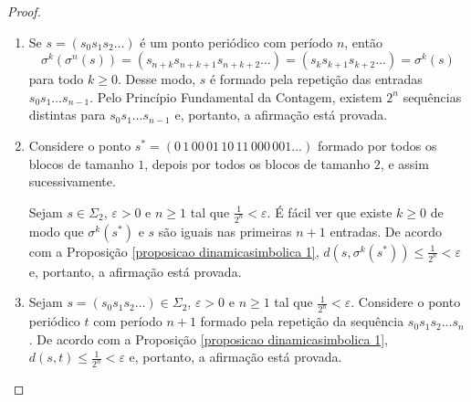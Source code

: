 \begin{proof}
\begin{enumerate}
\item Se $s = (s_0s_1s_2\dots)$ é um ponto periódico com período $n$, então
$$\sigma^k(\sigma^n(s)) = (s_{n+k}s_{n+k+1}s_{n+k+2}\dots) = (s_ks_{k+1}s_{k+2}\dots) = \sigma^k(s)$$
para todo $k \geq 0$. Desse modo, $s$ é formado pela repetição das entradas $s_0 s_1 \dots s_{n-1}$. Pelo Princípio Fundamental da Contagem, existem $2^n$ sequências distintas para  $s_0 s_1 \dots s_{n-1}$ e, portanto, a afirmação está provada.

\item Considere o ponto $s^* = (0 \, 1 \, 0 0 \, 0 1 \, 1 0 \, 1 1 \, 0 0 0 \, 0 0 1 \dots)$ formado por todos os blocos de tamanho $1$, depois por todos os blocos de tamanho $2$, e assim sucessivamente. 

Sejam $s \in \Sigma_2$, $\varepsilon > 0$ e $n \geq 1$ tal que $\frac{1}{2^n} < \varepsilon$. É fácil ver que existe $k \geq 0$ de modo que $\sigma^k(s^*)$ e $s$ são iguais nas primeiras $n+1$ entradas. De acordo com a Proposição \ref{proposicao dinamicasimbolica 1}, $d(s, \sigma^k(s^*)) \leq \frac{1}{2^n} < \varepsilon$ e, portanto, a afirmação está provada.

\item Sejam $s = (s_0 s_1 s_2 \dots) \in \Sigma_2$, $\varepsilon > 0$ e $n \geq 1$ tal que $\frac{1}{2^n} < \varepsilon$. Considere o ponto periódico $t$ com período $n+1$ formado pela repetição da sequência $s_0 s_1 s_2 \dots s_n$. De acordo com a Proposição \ref{proposicao dinamicasimbolica 1}, $d(s, t) \leq \frac{1}{2^n} < \varepsilon$ e, portanto, a afirmação está provada.
\end{enumerate}
\end{proof}